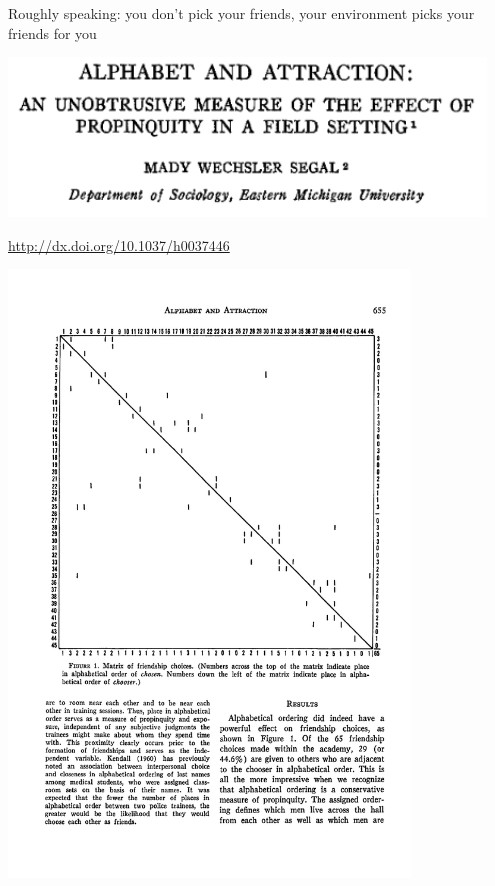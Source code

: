 \documentclass{beamer}
\begin{document}
\begin{frame}

\begin{center}
{\Large Roughly speaking: you don't pick your friends, your environment picks your friends for you}
\end{center}

\end{frame}
\begin{frame}

\begin{center}
\includegraphics[width=0.95\textwidth]{figures/segal_alphabet_1974_title}
\end{center}

\vfill
\url{http://dx.doi.org/10.1037/h0037446}

\end{frame}
\begin{frame}

\begin{center}
\includegraphics[width=0.8\textwidth]{figures/segal_alphabet_1974_fig1}
\end{center}

\end{frame}
\end{document}

